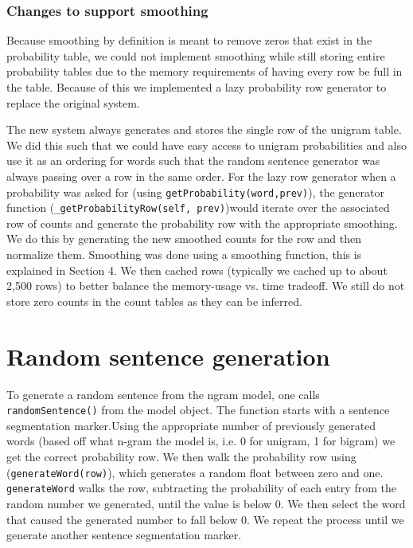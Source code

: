 \documentclass{article}
\begin{document}
\subsubsection{Changes to support smoothing}
Because smoothing by definition is meant to remove zeros that exist in the probability table, we could not implement smoothing while still storing entire probability tables due to the memory requirements of having every row be full in the table. Because of this we implemented a lazy probability row generator to replace the original system.

The new system always generates and stores the single row of the unigram table. We did this such that we could have easy access to unigram probabilities and also use it as an ordering for words such that the random sentence generator was always passing over a row in the same order. For the lazy row generator when a probability was asked for (using \texttt{getProbability(word,prev)}), the generator function (\texttt{\_getProbabilityRow(self, prev)})would iterate over the associated row of counts and generate the probability row with the appropriate smoothing. We do this by generating the new smoothed counts for the row and then normalize them. Smoothing was done using a smoothing function, this is explained in Section 4. We then cached rows (typically we cached up to about 2,500 rows) to better balance the memory-usage vs. time tradeoff. We still do not store zero counts in the count tables as they can be inferred.

\section{Random sentence generation}
To generate a random sentence from the ngram model, one calls \texttt{randomSentence()} from the model object. The function starts with a sentence segmentation marker.Using the appropriate number of previously generated words (based off what n-gram the model is, i.e. 0 for unigram, 1 for bigram) we get the correct probability row. We then walk the probability row using (\texttt{generateWord(row)}), which generates a random float between zero and one. \texttt{generateWord} walks the row, subtracting the probability of each entry from the random number we generated, until the value is below 0. We then select the word that caused the generated number to fall below 0. We repeat the process until we generate another sentence segmentation marker.

\iffalse
\end{document}
